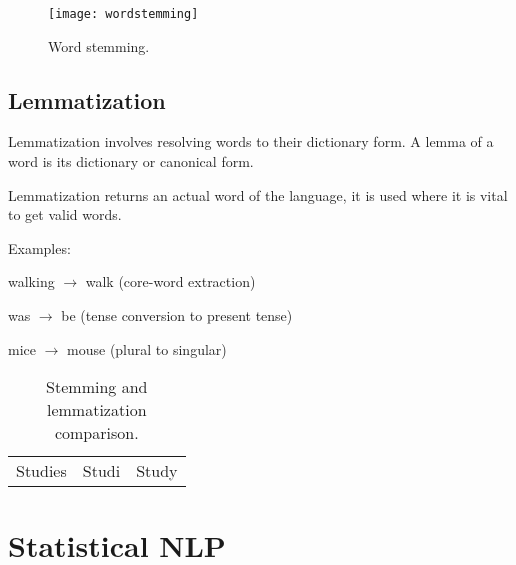 	\begin{figure}[h]
		\centering
		\texttt{[image: wordstemming]}
		\caption[Word stemming]{Word stemming.}
		\label{fig:wordstemming}
	\end{figure}


	\subsection{Lemmatization}
	\begin{bulletedlist}
		\item Lemmatization involves resolving words to their dictionary form.  A lemma of a word is its dictionary or canonical form.
		\item Lemmatization returns an actual word of the language, it is used where it is vital to get valid words.
		\item Examples:
		\begin{bulletedlist}
			\item walking $\rightarrow$ walk (core-word extraction)
			\item was $\rightarrow$ be (tense conversion to present tense)
			\item mice $\rightarrow$ mouse (plural to singular)
		\end{bulletedlist}
	\end{bulletedlist}

    \begin{table}[h]
        \centering
        \caption[stemming and lemmatization comparison]{Stemming and lemmatization comparison.}
        \label{tab:stemmingandlemma}
        \begin{tabular}{|c|c|c|} \hline
			\tablecolumnheadervlinesone{Word} 	& \tablecolumnheadervlinestwo{Stem}   & \tablecolumnheadervlinestwo{Lemma}\\ \hline
			Studies						        & Studi                               & Study \\ \hline
		\end{tabular}
	\end{table}



	\section{Statistical NLP}

